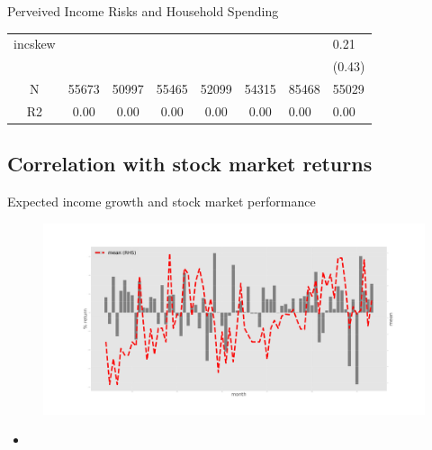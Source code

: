 \documentclass{beamer}
\begin{document}
\begin{frame}{Perveived Income Risks and Household Spending}
\begin{table}
{\begin{tabular}{ccccccll}
		incskew   &            &             &              &               &                &                 &             0.21 \\
		&            &             &              &               &                &                 &           (0.43) \\
		\hline 
		N         &      55673 &       50997 &        55465 &         52099 &          54315 &           85468 &            55029 \\
		R2        &       0.00 &        0.00 &         0.00 &          0.00 &           0.00 &            0.00 &             0.00 \\
		\hline 
	\end{tabular}
		}
	\end{table}
\end{frame}


\subsection{Correlation with stock market returns}

\begin{frame}{Expected income growth and stock market performance}
		\begin{figure}
		\centering
		\label{ts_mean}
		\includegraphics[width=\textwidth]{figures/tsMedmean.jpg}
	\end{figure}
	\begin{itemize}
		\item 
	\end{itemize}
\end{frame}
\end{document}
